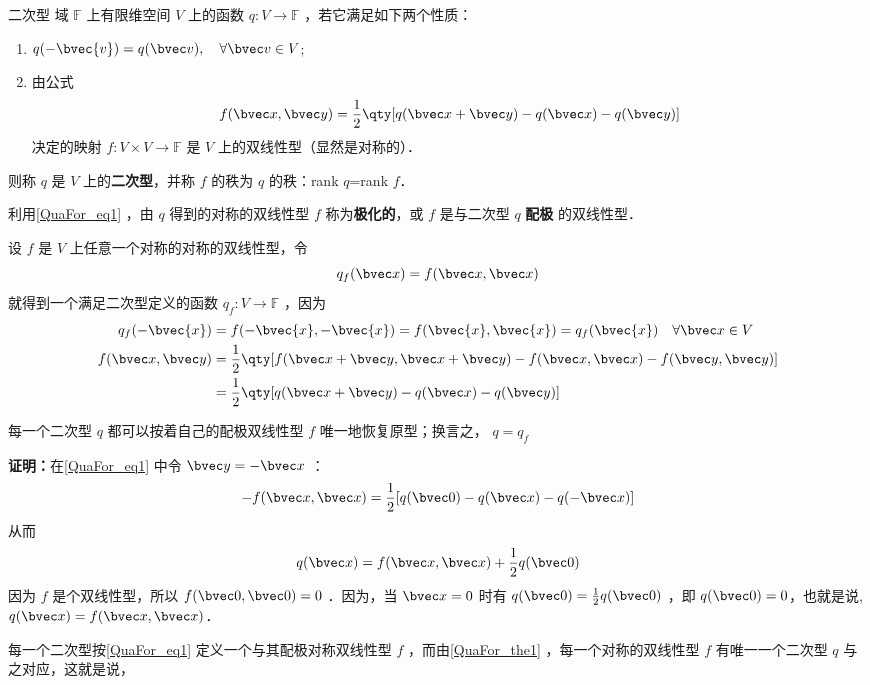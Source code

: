 
\begin{issues}
\issueTODO
\end{issues}

\begin{definition}{二次型}
域 $\mathbb{F}$ 上有限维空间 $V$ 上的函数 $q:V\rightarrow\mathbb{F}$ ，若它满足如下两个性质：
\begin{enumerate}
\item $q(-\bvec{v})=q(\bvec v),\quad \forall\bvec v\in V$;
\item 由公式
\begin{equation}\label{QuaFor_eq1}
f(\bvec x,\bvec y)=\frac{1}{2}\qty[q(\bvec x+\bvec y)-q(\bvec x)-q(\bvec y)]
\end{equation}
决定的映射 $f:V\times V\rightarrow\mathbb{F}$ 是 $V$ 上的双线性型（显然是对称的）．
\end{enumerate}
则称 $q$ 是 $V$ 上的\textbf{二次型}，并称 $f$ 的秩为 $q$ 的秩：rank $q$=rank $f$．
\end{definition}
利用\autoref{QuaFor_eq1} ，由 $q$ 得到的对称的双线性型 $f$ 称为\textbf{极化的}，或 $f$ 是与二次型 $q$ \textbf{配极} 的双线性型．
\begin{example}{}
设 $f$ 是 $V$ 上任意一个对称的对称的双线性型，令
\begin{equation}
q_f(\bvec x)=f(\bvec x,\bvec x)
\end{equation}
就得到一个满足二次型定义的函数 $q_f:V\rightarrow\mathbb{F}$ ，因为
\begin{equation}
\begin{aligned}
q_f(-\bvec{x})&=f(-\bvec{x},-\bvec{x})=f(\bvec{x},\bvec{x})=q_f(\bvec{x}) \quad \forall\bvec x\in V\\
f(\bvec x,\bvec y)&=\frac{1}{2}\qty[f(\bvec x+\bvec y,\bvec x+\bvec y)-f(\bvec x,\bvec x)-f(\bvec y,\bvec y)]\\
&=\frac{1}{2}\qty[q(\bvec x+\bvec y)-q(\bvec x)-q(\bvec y)]
\end{aligned}
\end{equation}
\end{example}
\begin{theorem}{}\label{QuaFor_the1}
每一个二次型 $q$ 都可以按着自己的配极双线性型 $f$ 唯一地恢复原型；换言之， $q=q_f$
\end{theorem}
\textbf{证明：}在\autoref{QuaFor_eq1} 中令 $\bvec y=-\bvec x$ ：
\begin{equation}
-f(\bvec x,\bvec x)=\frac{1}{2}[q(\bvec 0)-q(\bvec x)-q(-\bvec x)]
\end{equation}
从而
\begin{equation}
q(\bvec x)=f(\bvec x,\bvec x)+\frac{1}{2}q(\bvec 0)
\end{equation}
因为 $f$ 是个双线性型，所以 $f(\bvec 0,\bvec 0)=0$ ．因为，当 $\bvec x=0$ 时有 $q(\bvec 0)=\frac{1}{2}q(\bvec 0)$ ，即 $q(\bvec 0)=0$，也就是说, $q(\bvec x)=f(\bvec x,\bvec x)$．

每一个二次型按\autoref{QuaFor_eq1} 定义一个与其配极对称双线性型 $f$ ，而由\autoref{QuaFor_the1} ，每一个对称的双线性型 $f$ 有唯一一个二次型 $q$ 与之对应，这就是说，